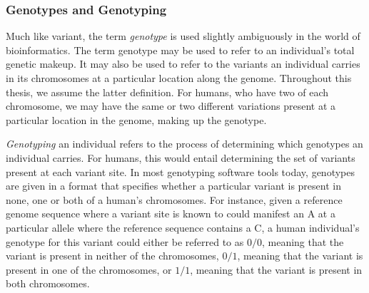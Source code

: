 \subsubsection{Genotypes and Genotyping} \label{background:biology:genotype_and_genotyping}
Much like variant, the term \textit{genotype} is used slightly ambiguously in the world of bioinformatics. 
The term genotype may be used to refer to an individual's total genetic makeup.
It may also be used to refer to the variants an individual carries in its chromosomes at a particular location along the genome.
Throughout this thesis, we assume the latter definition.
For humans, who have two of each chromosome, we may have the same or two different variations present at a particular location in the genome, making up the genotype.

\textit{Genotyping} an individual refers to the process of determining which genotypes an individual carries. 
For humans, this would entail determining the set of variants present at each variant site.
In most genotyping software tools today, genotypes are given in a format that specifies whether a particular variant is present in none, one or both of a human's chromosomes.
For instance, given a reference genome sequence where a variant site is known to could manifest an A at a particular allele where the reference sequence contains a C, a human individual's genotype for this variant could either be referred to as $0/0$, meaning that the variant is present in neither of the chromosomes, $0/1$, meaning that the variant is present in one of the chromosomes, or $1/1$, meaning that the variant is present in both chromosomes.


